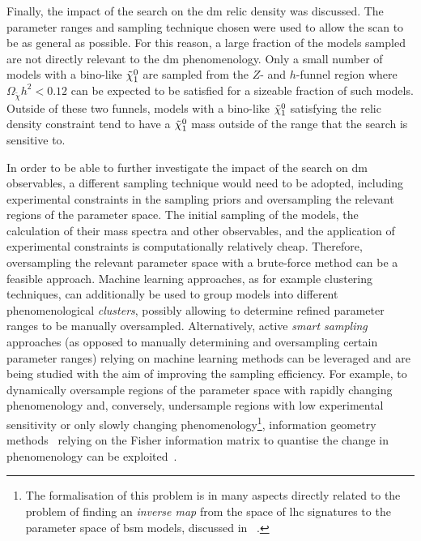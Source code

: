 Finally, the impact of the \onelepton search on the \gls{dm} relic density was discussed. The parameter ranges and sampling technique chosen were used to allow the scan to be as general as possible. For this reason, a large fraction of the models sampled are not directly relevant to the \gls{dm} phenomenology. Only a small number of models with a bino-like $\tilde{\chi}_1^0$ are sampled from the $Z$- and $h$-funnel region where $\Omega_{\tilde{\chi}} h^2 < 0.12$ can be expected to be satisfied for a sizeable fraction of such models. Outside of these two funnels, models with a bino-like $\tilde{\chi}_1^0$ satisfying the relic density constraint tend to have a $\tilde{\chi}_1^0$ mass outside of the range that the \onelepton search is sensitive to. 

In order to be able to further investigate the impact of the \onelepton search on \gls{dm} observables, a different sampling technique would need to be adopted, including experimental constraints in the sampling priors and oversampling the relevant regions of the parameter space.
The initial sampling of the models, the calculation of their mass spectra and other observables, and the application of experimental constraints is computationally relatively cheap. Therefore, oversampling the relevant parameter space with a brute-force method can be a feasible approach.
Machine learning approaches, as for example clustering techniques, can additionally be used to group models into different phenomenological \textit{clusters}, possibly allowing to determine refined parameter ranges to be manually oversampled.
Alternatively, active \textit{smart sampling} approaches (as opposed to manually determining and oversampling certain parameter ranges) relying on machine learning methods can be leveraged and are being studied with the aim of improving the sampling efficiency. For example, to dynamically oversample regions of the parameter space with rapidly changing phenomenology and, conversely, undersample regions with low experimental sensitivity or only slowly changing phenomenology\footnote{The formalisation of this problem is in many aspects directly related to the problem of finding an \textit{inverse map} from the space of \gls{lhc} signatures to the parameter space of \gls{bsm} models, discussed in ~\cite{ArkaniHamed:2005px}.}, information geometry methods~\cite{amari1985differential-geometrical} relying on the Fisher information matrix to quantise the change in phenomenology can be exploited~\cite{information_geometry}.


